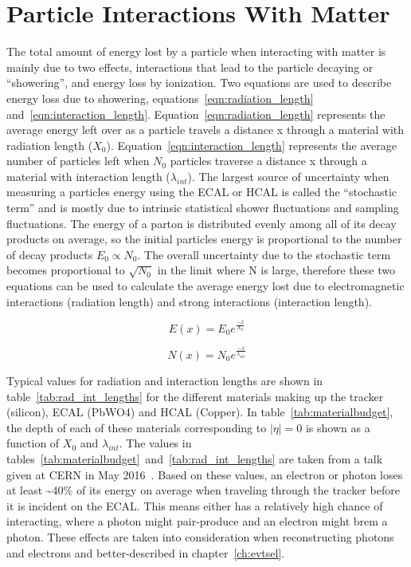 \section{Particle Interactions With Matter}

The total amount of energy lost by a particle when interacting with matter is mainly due to two effects,
interactions that lead to the particle decaying or ``showering'',
and energy loss by ionization.
Two equations are used to describe energy loss due to showering, equations~\ref{eqn:radiation_length} and~\ref{eqn:interaction_length}.
Equation~\ref{eqn:radiation_length} represents the average energy left over as a particle travels a distance x through a material with radiation length ($X_{0}$).
Equation~\ref{eqn:interaction_length} represents the average number of particles left when $N_{0}$ particles traverse a distance x through a material with interaction length ($\lambda_{int}$).
The largest source of uncertainty when measuring a particles energy using the ECAL or HCAL is called the ``stochastic term''
and is mostly due to intrinsic statistical shower fluctuations and sampling fluctuations.
The energy of a parton is distributed evenly among all of its decay products on average,
so the initial particles energy is proportional to the number of decay products $E_{0} \propto N_{0}$.
The overall uncertainty due to the stochastic term becomes proportional to $\sqrt{N_{0}}$ in the limit where N is large,
therefore these two equations can be used to calculate the average energy lost due to
electromagnetic interactions (radiation length) and strong interactions (interaction length).

\begin{equation}
  \label{eqn:radiation_length}
  E(x) = E_{0}e^{\frac{-x}{X_{0}}}  
\end{equation}

\begin{equation}
  \label{eqn:interaction_length}
  N(x) = N_{0}e^{\frac{-x}{\lambda_{int}}}  
\end{equation}

Typical values for radiation and interaction lengths are shown in table~\ref{tab:rad_int_lengths}
for the different materials making up the tracker (silicon), ECAL (PbWO4) and HCAL (Copper).
In table~\ref{tab:materialbudget}, the depth of each of these materials corresponding to $|\eta| = 0$ is shown as a function of $X_{0}$ and $\lambda_{int}$.
The values in tables~\ref{tab:materialbudget}~and~\ref{tab:rad_int_lengths} are taken from a talk given at CERN in May 2016~\cite{calorimetry}.
Based on these values, an electron or photon loses at least \textasciitilde{}40\%
of its energy on average when traveling through the tracker before it is incident on the ECAL.
This means either has a relatively high chance of interacting, where a photon might pair-produce and an electron might brem a photon.
These effects are taken into consideration when reconstructing photons and electrons and better-described in chapter~\ref{ch:evtsel}.

